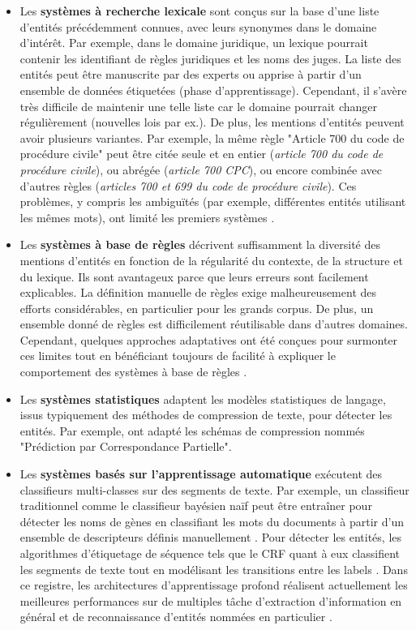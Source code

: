 \begin{itemize}
\item Les \textbf{systèmes à recherche lexicale} sont conçus sur la base d'une liste d'entités précédemment connues, avec leurs synonymes dans le domaine d'intérêt. Par exemple, dans le domaine juridique, un lexique pourrait contenir les identifiant de règles juridiques et les noms des juges. La liste des entités peut être manuscrite par des experts ou apprise à partir d'un ensemble de données étiquetées (phase d'apprentissage). Cependant, il s'avère très difficile de maintenir une telle liste car le domaine pourrait changer régulièrement (nouvelles lois par ex.). De plus, les mentions d'entités peuvent avoir plusieurs variantes. Par exemple, la même règle "Article 700 du code de procédure civile" peut être citée seule et en entier (\textit{article 700 du code de procédure civile}), ou abrégée (\textit{article 700 CPC}), ou encore combinée avec d'autres règles (\textit{articles 700 et 699 du code de procédure civile}). Ces problèmes, y compris les ambiguïtés (par exemple, différentes entités utilisant les mêmes mots), ont limité les premiers systèmes \citep{palmer1997learnedLookup}.

\item Les \textbf{systèmes à base de règles} décrivent suffisamment la diversité des mentions d'entités en fonction de la régularité du contexte, de la structure et du lexique. Ils sont avantageux parce que leurs erreurs sont facilement explicables. La définition manuelle de règles exige malheureusement des efforts considérables, en particulier pour les grands corpus. De plus, un ensemble donné de règles est difficilement réutilisable dans d'autres domaines. Cependant, quelques approches adaptatives ont été conçues pour surmonter ces limites tout en bénéficiant toujours de facilité à expliquer le comportement des systèmes à base de règles \citep{siniakov2008gropusrulebased,chiticariu2010adaptativerulebased}.

\item Les \textbf{systèmes statistiques} adaptent les modèles statistiques de langage, issus typiquement des méthodes de compression de texte, pour détecter les entités. Par exemple, \citet{witten1999languagemodel} ont adapté les schémas de compression nommés "Prédiction par Correspondance Partielle".

\item Les \textbf{systèmes basés sur l'apprentissage automatique} exécutent des classifieurs multi-classes sur des segments de texte. Par exemple, un classifieur traditionnel comme le classifieur bayésien naïf peut être entraîner pour détecter les noms de gènes en classifiant les mots du documents à partir d'un ensemble de descripteurs définis manuellement \citep{persson2012nbbioner}. Pour détecter les entités, les algorithmes d'étiquetage de séquence tels que le CRF quant à eux classifient les segments de texte tout en modélisant les transitions entre les labels \citep{finkel2005stanfordcrfner}. Dans ce registre, les architectures d'apprentissage profond réalisent actuellement les meilleures performances sur de multiples tâche d'extraction d'information en général et de reconnaissance d'entités nommées en particulier \citep{lample2016nnner}.
\end{itemize}
